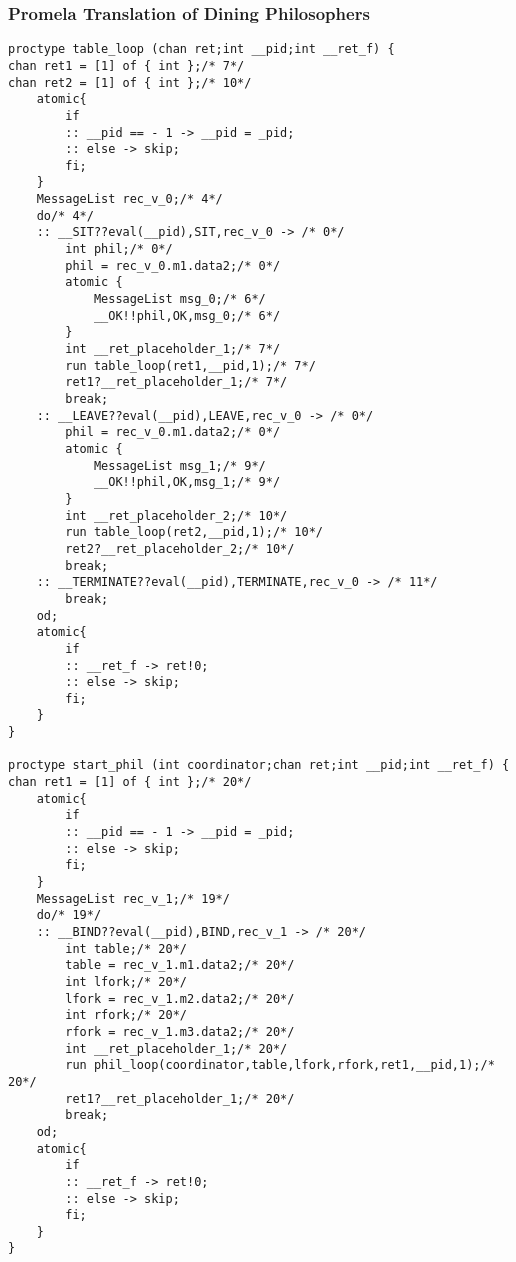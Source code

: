 \subsubsection{Promela Translation of Dining Philosophers}
\begin{lstlisting}[xleftmargin=.01\linewidth, xrightmargin=0.01\linewidth, caption={Dining Philosophers Promela translation.}, label={lst:promela_dp}]
proctype table_loop (chan ret;int __pid;int __ret_f) {
chan ret1 = [1] of { int };/* 7*/ 
chan ret2 = [1] of { int };/* 10*/ 
	atomic{
		if
		:: __pid == - 1 -> __pid = _pid;
		:: else -> skip;
		fi;
	}
	MessageList rec_v_0;/* 4*/ 
	do/* 4*/ 
	:: __SIT??eval(__pid),SIT,rec_v_0 -> /* 0*/ 
		int phil;/* 0*/ 
		phil = rec_v_0.m1.data2;/* 0*/ 
		atomic {
			MessageList msg_0;/* 6*/ 
			__OK!!phil,OK,msg_0;/* 6*/ 
		}
		int __ret_placeholder_1;/* 7*/ 
		run table_loop(ret1,__pid,1);/* 7*/ 
		ret1?__ret_placeholder_1;/* 7*/ 
		break;
	:: __LEAVE??eval(__pid),LEAVE,rec_v_0 -> /* 0*/ 
		phil = rec_v_0.m1.data2;/* 0*/ 
		atomic {
			MessageList msg_1;/* 9*/ 
			__OK!!phil,OK,msg_1;/* 9*/ 
		}
		int __ret_placeholder_2;/* 10*/ 
		run table_loop(ret2,__pid,1);/* 10*/ 
		ret2?__ret_placeholder_2;/* 10*/ 
		break;
	:: __TERMINATE??eval(__pid),TERMINATE,rec_v_0 -> /* 11*/ 
		break;
	od;
	atomic{
		if
		:: __ret_f -> ret!0;
		:: else -> skip;
		fi;
	}
}

proctype start_phil (int coordinator;chan ret;int __pid;int __ret_f) {
chan ret1 = [1] of { int };/* 20*/ 
	atomic{
		if
		:: __pid == - 1 -> __pid = _pid;
		:: else -> skip;
		fi;
	}
	MessageList rec_v_1;/* 19*/ 
	do/* 19*/ 
	:: __BIND??eval(__pid),BIND,rec_v_1 -> /* 20*/ 
		int table;/* 20*/ 
		table = rec_v_1.m1.data2;/* 20*/ 
		int lfork;/* 20*/ 
		lfork = rec_v_1.m2.data2;/* 20*/ 
		int rfork;/* 20*/ 
		rfork = rec_v_1.m3.data2;/* 20*/ 
		int __ret_placeholder_1;/* 20*/ 
		run phil_loop(coordinator,table,lfork,rfork,ret1,__pid,1);/* 20*/ 
		ret1?__ret_placeholder_1;/* 20*/ 
		break;
	od;
	atomic{
		if
		:: __ret_f -> ret!0;
		:: else -> skip;
		fi;
	}
}


\end{lstlisting}
